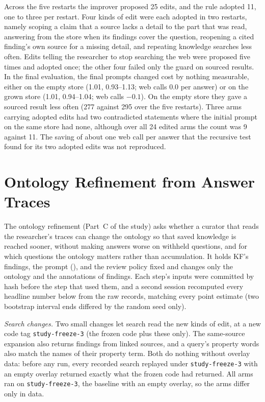 \documentclass[journal=mamobx,manuscript=suppinfo]{achemso}
\newcommand{\code}[1]{\texttt{#1}}
\newcommand{\ident}[1]{\path{#1}}
\begin{document}
Across the five restarts the improver proposed 25 edits, and the rule adopted 11, one to three per restart.
Four kinds of edit were each adopted in two restarts, namely scoping a claim that a source lacks a detail to the part that was read, answering from the store when its findings cover the question, reopening a cited finding's own source for a missing detail, and repeating knowledge searches less often.
Edits telling the researcher to stop searching the web were proposed five times and adopted once; the other four failed only the guard on sourced results.
In the final evaluation, the final prompts changed cost by nothing measurable, either on the empty store (1.01, 0.93--1.13; web calls 0.0 per answer) or on the grown store (1.01, 0.94--1.04; web calls $-0.1$).
On the empty store they gave a sourced result less often (277 against 295 over the five restarts).
Three arms carrying adopted edits had two contradicted statements where the initial prompt on the same store had none, although over all 24 edited arms the count was 9 against 11.
The saving of about one web call per answer that the recursive test found for its two adopted edits was not reproduced.

\section{Ontology Refinement from Answer Traces}
\label{si:ontology}

The ontology refinement (Part~C of the study) asks whether a curator that reads the researcher's traces can change the ontology so that saved knowledge is reached sooner, without making answers worse on withheld questions, and for which questions the ontology matters rather than accumulation.
It holds KF's findings, the prompt (\ident{0b7bb1483235}), and the review policy fixed and changes only the ontology and the annotations of findings.
Each step's inputs were committed by hash before the step that used them, and a second session recomputed every headline number below from the raw records, matching every point estimate (two bootstrap interval ends differed by the random seed only).

\emph{Search changes.}
Two small changes let search read the new kinds of edit, at a new code tag \code{study-freeze-3} (the frozen code plus these only).
The same-source expansion also returns findings from linked sources, and a query's property words also match the names of their property term.
Both do nothing without overlay data: before any run, every recorded search replayed under \code{study-freeze-3} with an empty overlay returned exactly what the frozen code had returned.
All arms ran on \code{study-freeze-3}, the baseline with an empty overlay, so the arms differ only in data.
\end{document}
